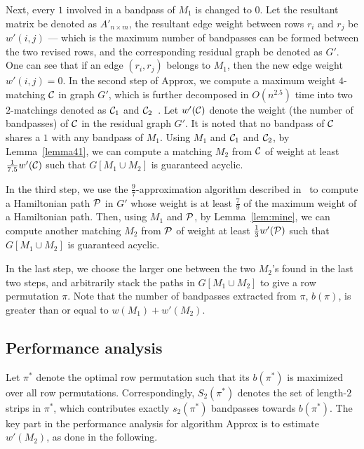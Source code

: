 \documentclass[11pt,twoside]{article}\usepackage{amssymb,latexsym,graphicx,hyperref}\usepackage{epstopdf}
\begin{document}
Next, every $1$ involved in a bandpass of $M_1$ is changed to $0$.
Let the resultant matrix be denoted as $A'_{n \times m}$,
the resultant edge weight between rows $r_i$ and $r_j$ be $w'(i, j)$
--- which is the maximum number of bandpasses can be formed between the two revised rows,
and the corresponding residual graph be denoted as $G'$.
One can see that if an edge $(r_i, r_j)$ belongs to $M_1$, then the new edge weight $w'(i, j) = 0$.
In the second step of {\sc Approx}, we compute a maximum weight $4$-matching ${\cal C}$ in graph $G'$,
which is further decomposed in $O(n^{2.5})$ time into two $2$-matchings denoted as ${\cal C}_1$ and ${\cal C}_2$~\cite{Har69,Die05}.
Let $w'({\cal C})$ denote the weight (the number of bandpasses) of ${\cal C}$ in the residual graph $G'$.
It is noted that no bandpass of ${\cal C}$ shares a $1$ with any bandpass of $M_1$.
Using $M_1$ and ${\cal C}_1$ and ${\cal C}_2$, by Lemma~\ref{lemma41},
we can compute a matching $M_2$ from ${\cal C}$ of weight at least $\frac 1{7.5} w'({\cal C})$ such that $G[M_1 \cup M_2]$ is guaranteed acyclic.

In the third step, we use the $\frac 97$-approximation algorithm described in~\cite{PMM09} to compute a Hamiltonian path ${\cal P}$ in $G'$
whose weight is at least $\frac 79$ of the maximum weight of a Hamiltonian path.
Then, using $M_1$ and ${\cal P}$, by Lemma~\ref{lem:mine},
we can compute another matching $M_2$ from ${\cal P}$ of weight at least $\frac 13 w'({\cal P})$ such that $G[M_1 \cup M_2]$ is guaranteed acyclic.

In the last step, we choose the larger one between the two $M_2$'s found in the last two steps,
and arbitrarily stack the paths in $G[M_1 \cup M_2]$ to give a row permutation $\pi$.
Note that the number of bandpasses extracted from $\pi$, $b(\pi)$, is greater than or equal to $w(M_1) + w'(M_2)$.


\subsection{Performance analysis}
Let $\pi^*$ denote the optimal row permutation such that its $b(\pi^*)$ is maximized over all row permutations.
Correspondingly, $S_2(\pi^*)$ denotes the set of length-$2$ strips in $\pi^*$, which contributes exactly $s_2(\pi^*)$ bandpasses towards $b(\pi^*)$.
The key part in the performance analysis for algorithm {\sc Approx} is to estimate $w'(M_2)$, as done in the following.
\end{document}
